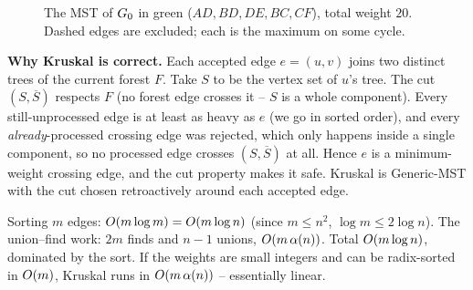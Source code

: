 \begin{figure}[H]
\centering
{}
\caption{The MST of $G_0$ in green ($AD,BD,DE,BC,CF$), total weight $20$. Dashed edges are excluded; each is the maximum on some cycle.}
\label{ch06:mst}
\end{figure}

\begin{whybox}
\textbf{Why Kruskal is correct.} Each accepted edge $e=(u,v)$ joins two distinct trees of the current forest $F$. Take $S$ to be the vertex set of $u$'s tree. The cut $(S,\overline S)$ respects $F$ (no forest edge crosses it -- $S$ is a whole component). Every still-unprocessed edge is at least as heavy as $e$ (we go in sorted order), and every \emph{already}-processed crossing edge was rejected, which only happens inside a single component, so no processed edge crosses $(S,\overline S)$ at all. Hence $e$ is a minimum-weight crossing edge, and the cut property makes it safe. Kruskal is Generic-MST with the cut chosen retroactively around each accepted edge.
\end{whybox}

\begin{complexitybox}
Sorting $m$ edges: $O(m\log m)=O(m\log n)$ (since $m\le n^2$, $\log m\le 2\log n$). The union--find work: $2m$ finds and $n-1$ unions, $O(m\,\alpha(n))$. Total $O(m\log n)$, dominated by the sort. If the weights are small integers and can be radix-sorted in $O(m)$, Kruskal runs in $O(m\,\alpha(n))$ -- essentially linear.
\end{complexitybox}

